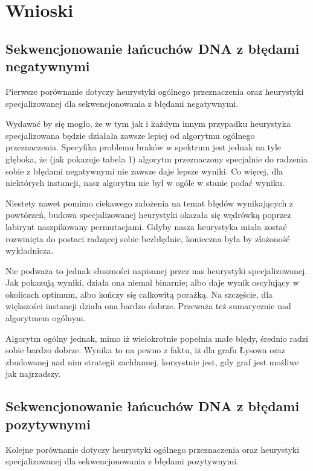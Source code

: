 \documentclass[a4paper]{article}
\begin{document}
\section{Wnioski}

\subsection{Sekwencjonowanie łańcuchów DNA z błędami negatywnymi}

Pierwsze porównanie dotyczy heurystyki ogólnego przeznaczenia oraz heurystyki specjalizowanej dla sekwencjonowania
z błędami negatywnymi.

Wydawać by się mogło, że w tym jak i każdym innym przypadku heurystyka specjalizowana będzie działała zawsze lepiej
od algorytmu ogólnego przeznaczenia. Specyfika problemu braków w spektrum jest jednak na tyle głęboka, że (jak pokazuje
tabela 1) algorytm przeznaczony specjalnie do radzenia sobie z błędami negatywnymi nie zawsze daje lepsze wyniki.
Co więcej, dla niektórych instancji, nasz algorytm nie był w ogóle w stanie podać wyniku.

Niestety nawet pomimo ciekawego założenia na temat błędów wynikających z powtórzeń, budowa specjalizowanej heurystyki
okazała się wędrówką poprzez labirynt naszpikowany permutacjami. Gdyby nasza heurystyka miała zostać rozwinięta do
postaci radzącej sobie bezbłędnie, konieczna była by złożoność wykładnicza.

Nie podważa to jednak słuszności napisanej przez nas heurystyki specjalizowanej. Jak pokazują wyniki, działa ona niemal
binarnie; albo daje wynik oscylujący w okolicach optimum, albo kończy się całkowitą porażką. Na szczęście, dla
większości instancji działa ona bardzo dobrze. Przeważa też sumarycznie nad algorytmem ogólnym.

Algorytm ogólny jednak, mimo iż wielokrotnie popełnia małe błędy, średnio radzi sobie bardzo dobrze. Wynika to na pewno
z faktu, iż dla grafu Łysowa oraz zbudowanej nad nim strategii zachłannej, korzystnie jest, gdy graf jest możliwe jak
najrzadszy.

\subsection{Sekwencjonowanie łańcuchów DNA z błędami pozytywnymi}

Kolejne porównanie dotyczy heurystyki ogólnego przeznaczenia oraz heurystyki specjalizowanej dla sekwencjonowania
z błędami pozytywnymi.
\end{document}

